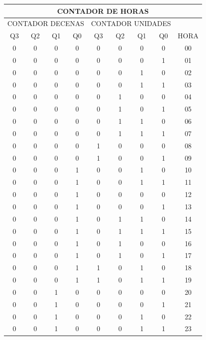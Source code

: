 \begin{table}[]
    \begin{tabular}{|c|c|c|c|c|c|c|c|c|}
    \hline
    \multicolumn{9}{|c|}{CONTADOR DE HORAS} \\ \hline
    \multicolumn{4}{|c|}{CONTADOR DECENAS} & \multicolumn{4}{c|}{CONTADOR UNIDADES} &  \\ \cline{1-8}
    Q3 & Q2 & Q1 & Q0 & Q3 & Q2 & Q1 & Q0 & \multirow{-2}{*}{HORA} \\ \hline
    0 & 0 & 0 & 0 & 0 & 0 & 0 & 0 & 00 \\ \hline
    0 & 0 & 0 & 0 & 0 & 0 & 0 & 1 & 01 \\ \hline
    0 & 0 & 0 & 0 & 0 & 0 & 1 & 0 & 02 \\ \hline
    0 & 0 & 0 & 0 & 0 & 0 & 1 & 1 & 03 \\ \hline
    0 & 0 & 0 & 0 & 0 & 1 & 0 & 0 & 04 \\ \hline
    0 & 0 & 0 & 0 & 0 & 1 & 0 & 1 & 05 \\ \hline
    0 & 0 & 0 & 0 & 0 & 1 & 1 & 0 & 06 \\ \hline
    0 & 0 & 0 & 0 & 0 & 1 & 1 & 1 & 07 \\ \hline
    0 & 0 & 0 & 0 & 1 & 0 & 0 & 0 & 08 \\ \hline
    0 & 0 & 0 & 0 & 1 & 0 & 0 & 1 & 09 \\ \hline
    0 & 0 & 0 & 1 & 0 & 0 & 1 & 0 & 10 \\ \hline
    0 & 0 & 0 & 1 & 0 & 0 & 1 & 1 & 11 \\ \hline
    0 & 0 & 0 & 1 & 0 & 0 & 0 & 0 & 12 \\ \hline
    0 & 0 & 0 & 1 & 0 & 0 & 0 & 1 & 13 \\ \hline
    0 & 0 & 0 & 1 & 0 & 1 & 1 & 0 & 14 \\ \hline
    0 & 0 & 0 & 1 & 0 & 1 & 1 & 1 & 15 \\ \hline
    0 & 0 & 0 & 1 & 0 & 1 & 0 & 0 & 16 \\ \hline
    0 & 0 & 0 & 1 & 0 & 1 & 0 & 1 & 17 \\ \hline
    0 & 0 & 0 & 1 & 1 & 0 & 1 & 0 & 18 \\ \hline
    0 & 0 & 0 & 1 & 1 & 0 & 1 & 1 & 19 \\ \hline
    0 & 0 & 1 & 0 & 0 & 0 & 0 & 0 & 20 \\ \hline
    0 & 0 & 1 & 0 & 0 & 0 & 0 & 1 & 21 \\ \hline
    0 & 0 & 1 & 0 & 0 & 0 & 1 & 0 & 22 \\ \hline
    0 & 0 & 1 & 0 & 0 & 0 & 1 & 1 & 23 \\ \hline

\end{tabular}
\end{table}
